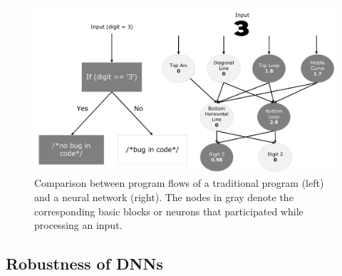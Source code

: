 \documentclass[10pt, conference, a4paper, final]{IEEEtran}
\begin{document}
\begin{figure}{}
    \centering
    \includegraphics[width=\linewidth]{paper_images/traditional and DNN.pdf}
    \caption{ Comparison between program flows of a traditional program (left) and a neural network (right). The nodes in gray denote the corresponding basic blocks or neurons that participated while processing an input.}
    \label{fig:graph}
\end{figure}


\subsection{Robustness of DNNs}%


\end{document}

